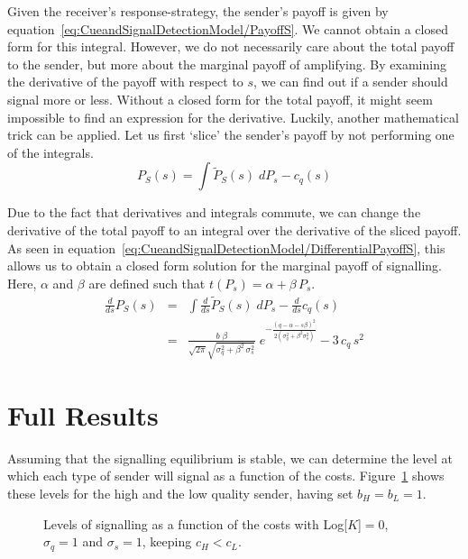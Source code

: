 \documentclass[a4paper,12pt]{article}
\numberwithin{equation}{section}
\begin{document}
Given the receiver's response-strategy, the sender's payoff is given by equation~\ref{eq:CueandSignalDetectionModel/PayoffS}. We cannot obtain a closed form for this integral. However, we do not necessarily care about the total payoff to the sender, but more about the marginal payoff of amplifying. By examining the derivative of the payoff with respect to $s$, we can find out if a sender should signal more or less. Without a closed form for the total payoff, it might seem impossible to find an expression for the derivative. Luckily, another mathematical trick can be applied. Let us first `slice' the sender's payoff by not performing one of the integrals.
\begin{equation}
\label{eq:CueandSignalDetectionModel/SlicedPayoffS}
P_{S}(s) = \displaystyle \int \tilde{P}_{S}(s) \; dP_{s}-c_{q}(s)
\end{equation}

Due to the fact that derivatives and integrals commute, we can change the derivative of the total payoff to an integral over the derivative of the sliced payoff. As seen in equation~\ref{eq:CueandSignalDetectionModel/DifferentialPayoffS}, this allows us to obtain a closed form solution for the marginal payoff of signalling. Here, $\alpha$ and $\beta$ are defined such that $t(P_{s})=\alpha+\beta \, P_{s}$.
\begin{equation}
\label{eq:CueandSignalDetectionModel/DifferentialPayoffS}
\begin{array}{rcl}
\frac{d}{ds} P_{S}(s) &=& \displaystyle \int \frac{d}{ds} \tilde{P}_{S}(s) \; dP_{s} - \frac{d}{ds} c_{q}(s)\\[3mm]
&=& \displaystyle \frac{b \; \beta}{\sqrt{2 \pi} \sqrt{\sigma_{q}^{2} + \beta^2 \, \sigma_{s}^{2}}} \; e^{-\frac{(q-\alpha-s \beta)^{2}}{2(\sigma_{q}^{2}+\beta^{2} \sigma_{s}^{2})}} - 3 \, c_{q} \, s^2
\end{array}
\end{equation}

\newpage


\section{Full Results}
\label{sec:Full Results}

Assuming that the signalling equilibrium is stable, we can determine the level at which each type of sender will signal as a function of the costs. Figure~\ref{fig:Figure 3334} shows these levels for the high and the low quality sender, having set $b_{H}=b_{L}=1$.
\begin{figure}[h]
\captionsetup{width=380pt}
\begin{center}
\hspace{4mm}
\caption{Levels of signalling as a function of the costs with Log[$K$]$=0$, $\sigma_{q}=1$ and $\sigma_{s}=1$, keeping $c_{H}<c_{L}$.}
\label{fig:Figure 3334}
\end{center}
\end{figure}
\end{document}
